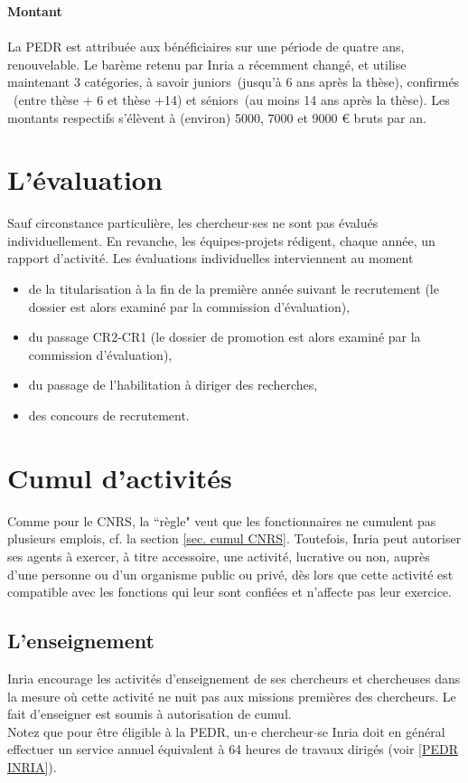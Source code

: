 {\bf Montant}\\
\\La PEDR est attribu\'ee aux b\'en\'eficiaires sur une p\'eriode de quatre ans, renouvelable. Le bar\`eme retenu par Inria a r\'ecemment chang\'e, et utilise maintenant 3 cat\'egories, \`a savoir \og juniors\fg\ (jusqu'\`a 6 ans apr\`es la th\`ese), \og confirm\'es \fg\ (entre th\`ese + 6 et th\`ese +14) et \og s\'eniors\fg\ (au moins 14 ans apr\`es la th\`ese). Les montants respectifs s'\'el\`event \`a (environ) 5000, 7000 et 9000 \euro{} bruts par an.

\section{L'\'evaluation} \label{CE-INRIA}
Sauf circonstance particuli\`ere, les chercheur$\cdot$ses ne sont pas \'evalu\'es individuellement.
En revanche, les \'equipes-projets r\'edigent, chaque ann\'ee, un rapport d'activit\'e. Les
\'evaluations individuelles interviennent au moment
\begin{itemize}
\item de la titularisation \`a la fin de la premi\`ere ann\'ee suivant
le recrutement (le dossier est alors examin\'e par la commission
d'\'evaluation),
\item du passage CR2-CR1 (le dossier de promotion est alors examin\'e
par la commission d'\'evaluation),
\item du passage de l'habilitation \`a diriger des recherches,
\item des concours de recrutement.
\end{itemize}

\section{Cumul d'activit\'es}
\label{sec. cumul INRIA}
Comme pour le CNRS, la ``r\`egle" veut que les fonctionnaires ne cumulent pas plusieurs emplois,
cf. la section \ref{sec. cumul CNRS}.
Toutefois, Inria peut autoriser ses agents \`a exercer, \`a titre accessoire, une activit\'e, lucrative ou non,
aupr\`es d'une personne ou d'un organisme public ou priv\'e, d\`es lors que cette activit\'e
est compatible avec les fonctions qui leur sont confi\'ees et n'affecte pas leur exercice.

\subsection{L'enseignement}
Inria encourage les activit\'es d'enseignement de ses
chercheurs et chercheuses dans la mesure o\`u cette activit\'e ne nuit pas aux
missions premi\`eres des chercheurs. Le fait d'enseigner est soumis
\`a autorisation de cumul.\\
Notez que pour \^etre \'eligible \`a la PEDR, un$\cdot$e chercheur$\cdot$se Inria doit en g\'en\'eral effectuer un service annuel \'equivalent \`a 64 heures de travaux dirig\'es (voir \ref{PEDR INRIA}).

